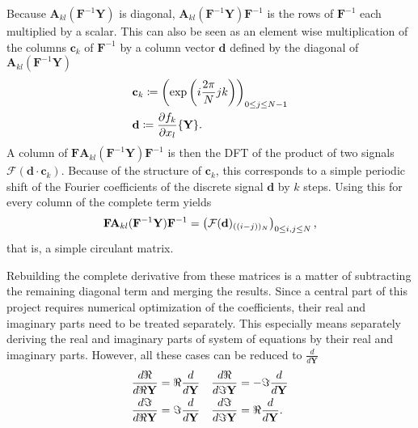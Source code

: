 Because $\mathbf A_{kl}(\mathbf{F}^{-1} \mathbf{Y})$ is diagonal, $\mathbf A_{kl}(\mathbf{F}^{-1} \mathbf{Y}) \mathbf{F}^{-1}$ is the rows of $\mathbf F^{-1}$ each multiplied by a scalar.
This can also be seen as an element wise multiplication of the columns $\mathbf c_k$ of $\mathbf F^{-1}$ by a column vector $\mathbf d$ defined by the diagonal of $\mathbf A_{kl}(\mathbf{F}^{-1} \mathbf{Y})$
	\begin{align*}
		&\mathbf c_k \coloneqq \left(\exp\left(i\frac{2\pi}{N} j k\right)\right)_{0 \le j \le N-1}\\
		&\mathbf d \coloneqq \frac{\partial f_k}{\partial x_l} \{\mathbf Y\} \text.
	\end{align*}
A column of $\mathbf{F} \mathbf A_{kl}(\mathbf{F}^{-1} \mathbf{Y}) \mathbf{F}^{-1}$ is then the DFT of the product of two signals $\mathcal F(\mathbf d \cdot \mathbf c_k)$.
Because of the structure of $\mathbf c_k$, this corresponds to a simple periodic shift of the Fourier coefficients of the discrete signal $\mathbf d$ by $k$ steps.
Using this for every column of the complete term yields
	\[
			\mathbf{F} \mathbf A_{kl}(\mathbf{F}^{-1} \mathbf{Y}) \mathbf{F}^{-1} = \left( \mathbf {\mathcal{F}}(\mathbf d)_{((i-j))_N} \right)_{0 \le i,j \le N} \text,
	\]
that is, a simple circulant matrix.

Rebuilding the complete derivative from these matrices is a matter of subtracting the remaining diagonal term and merging the results.
Since a central part of this project requires numerical optimization of the coefficients, their real and imaginary parts need to be treated separately.
This especially means separately deriving the real and imaginary parts of system of equations by their real and imaginary parts.
However, all these cases can be reduced to $\frac{d}{d \mathbf Y}$
\begin{align*}
	\frac{d \Re}{d\Re \mathbf Y} = \Re \frac{d}{d \mathbf Y} &&& \frac{d \Re}{d\Im \mathbf Y} = -\Im \frac{d}{d \mathbf Y}\\
	\frac{d \Im}{d\Re \mathbf Y} = \Im \frac{d}{d \mathbf Y} &&& \frac{d \Im}{d\Im \mathbf Y} = \Re \frac{d}{d \mathbf Y} \text.
\end{align*}
